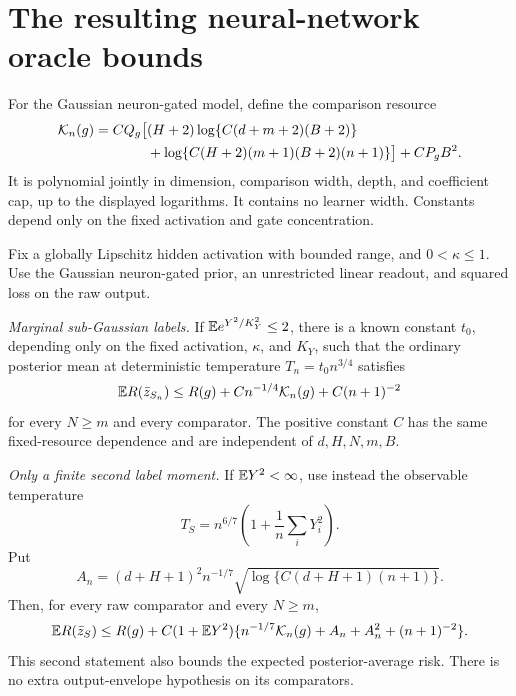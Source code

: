 \section{The resulting neural-network oracle bounds}
\label{sec:raw-assembly}
For the Gaussian neuron-gated model, define the comparison resource
\begin{align}
 \mathcal K_n(g)=C Q_g\big[&(H+2)\log\{C(d+m+2)(B+2)\}\notag\\
 &+\log\{C(H+2)(m+1)(B+2)(n+1)\}\big]+CP_gB^2.
 \label{eq:raw-comparison-resource}
\end{align}
It is polynomial jointly in dimension, comparison width, depth, and
coefficient cap, up to the displayed logarithms. It contains no learner
width. Constants depend only on the fixed activation and gate
concentration.

\begin{theorem}
\label{thm:raw-bounded-activation}
Fix a globally Lipschitz hidden activation with bounded range, and
$0<\kappa\le1$. Use the Gaussian neuron-gated prior, an unrestricted
linear readout, and squared loss on the raw output.

\emph{Marginal sub-Gaussian labels.} If
$\mathbb E e^{Y^2/K_Y^2}\le2$, there is a known constant $t_0$, depending
only on the fixed activation, $\kappa$, and $K_Y$, such that the
ordinary posterior mean at deterministic temperature
$T_n=t_0n^{3/4}$ satisfies
\begin{equation}
 \mathbb E R(\bar z_{S_n})\le R(g)
                  +C n^{-1/4}\mathcal K_n(g)+C(n+1)^{-2}
 \label{eq:raw-bounded-subgaussian}
\end{equation}
for every $N\ge m$ and every comparator. The positive constant $C$ has
the same fixed-resource dependence and are independent of $d,H,N,m,B$.

\emph{Only a finite second label moment.} If $\mathbb E Y^2<\infty$, use
instead the observable temperature
\[
 T_S=n^{6/7}\left(1+\frac1n\sum_iY_i^2\right).
\]
Put
\[
 A_n=(d+H+1)^2n^{-1/7}
          \sqrt{\log\{C(d+H+1)(n+1)\}}.
\]
Then, for every raw comparator and every $N\ge m$,
\begin{equation}
 \mathbb E R(\bar z_S)\le R(g)+C(1+\mathbb E Y^2)
       \{n^{-1/7}\mathcal K_n(g)+A_n+A_n^2+(n+1)^{-2}\}.
 \label{eq:raw-bounded-finitevariance}
\end{equation}
This second statement also bounds the expected posterior-average risk.
There is no extra output-envelope hypothesis on its comparators.
\end{theorem}
